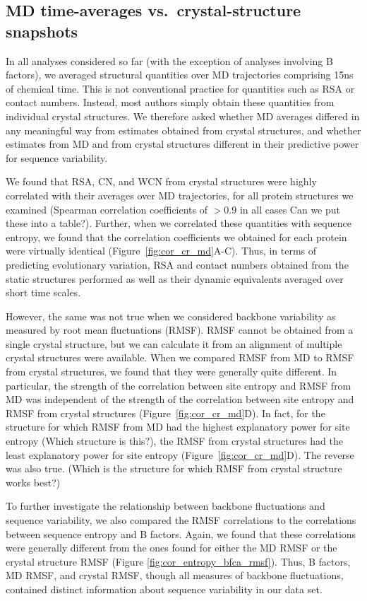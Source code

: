 \documentclass[12pt]{article}
\begin{document}
\subsection*{MD time-averages vs.\ crystal-structure snapshots}

In all analyses considered so far (with the exception of analyses involving B factors), we averaged structural quantities over MD trajectories comprising 15ns of chemical time. This is not conventional practice for quantities such as RSA or contact numbers. Instead, most authors simply obtain these quantities from individual crystal structures. We therefore asked whether MD averages differed in any meaningful way from estimates obtained from crystal structures, and whether estimates from MD and from crystal structures different in their predictive power for sequence variability.

We found that RSA, CN, and WCN from crystal structures were highly correlated with their averages over MD trajectories, for all protein structures we examined (Spearman correlation coefficients of $>0.9$ in all cases {\color{red}Can we put these into a table?}). Further, when we correlated these quantities with sequence entropy, we found that the correlation coefficients we obtained for each protein were virtually identical (Figure~\ref{fig:cor_cr_md}A-C). Thus, in terms of predicting evolutionary variation, RSA and contact numbers obtained from the static structures performed as well as their dynamic equivalents averaged over short time scales.

However, the same was not true when we considered backbone variability as measured by root mean fluctuations (RMSF). RMSF cannot be obtained from a single crystal structure, but we can calculate it from an alignment of multiple crystal structures were available. When we compared RMSF from MD to RMSF from crystal structures, we found that they were generally quite different. In particular, the strength of the correlation between site entropy and RMSF from MD was independent of the strength of the correlation between site entropy and RMSF from crystal structures (Figure~\ref{fig:cor_cr_md}D). In fact, for the structure for which RMSF from MD had the highest explanatory power for site entropy {\color{red}(Which structure is this?)}, the RMSF from crystal structures had the least explanatory power for site entropy (Figure~\ref{fig:cor_cr_md}D). The reverse was also true. {\color{red}(Which is the structure for which RMSF from crystal structure works best?)}

To further investigate the relationship between backbone fluctuations and sequence variability, we also compared the RMSF correlations to the correlations between sequence entropy and B factors. Again, we found that these correlations were generally different from the ones found for either the MD RMSF or the crystal structure RMSF (Figure \ref{fig:cor_entropy_bfca_rmsf}). Thus, B factors, MD RMSF, and crystal RMSF, though all measures of backbone fluctuations, contained distinct information about sequence variability in our data set.
\end{document}
